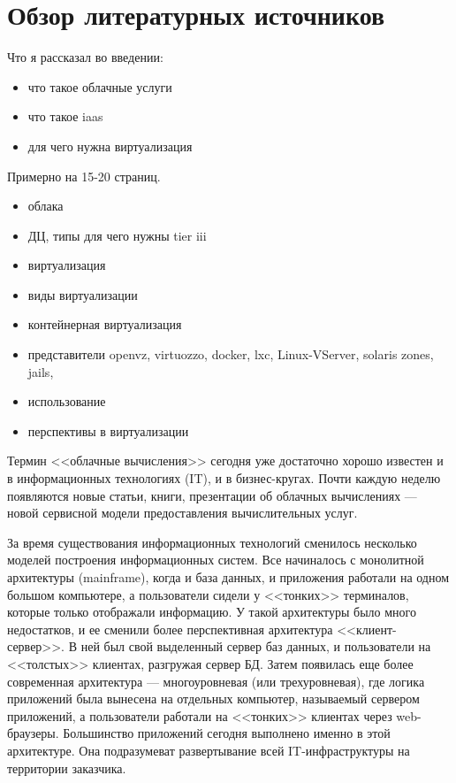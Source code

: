 \section{Обзор литературных источников}

Что я рассказал во введении:
\begin{itemize}
  \item что такое облачные услуги
  \item что такое iaas
  \item для чего нужна виртуализация
\end{itemize}


Примерно на 15-20 страниц.
\begin{itemize}
  \item облака
  \item ДЦ, типы для чего нужны tier iii
  \item виртуализация
  \item виды виртуализации
  \item контейнерная виртуализация
  \item представители openvz, virtuozzo, docker, lxc, Linux-VServer, solaris zones, jails, 
  \item использование
  \item перспективы в виртуализации
\end{itemize}

Термин <<облачные вычисления>> сегодня уже достаточно хорошо известен и в информационных технологиях (IT), и в бизнес-кругах.
Почти каждую неделю появляются новые статьи, книги, презентации об облачных вычислениях --- новой сервисной модели предоставления вычислительных услуг.

За время существования информационных технологий сменилось несколько моделей построения информационных систем.
Все начиналось с монолитной архитектуры (mainframe), когда и база данных, и приложения работали на одном большом компьютере, а пользователи сидели у <<тонких>> терминалов, которые только отображали информацию.
У такой архитектуры было много недостатков, и ее сменили более перспективная архитектура <<клиент-сервер>>.
В ней был свой выделенный сервер баз данных, и пользователи на <<толстых>> клиентах, разгружая сервер БД.
Затем появилась еще более современная архитектура --- многоуровневая (или трехуровневая), где логика приложений была вынесена на отдельных компьютер, называемый сервером приложений, а пользователи работали на <<тонких>> клиентах через web-браузеры.
Большинство приложений сегодня выполнено именно в этой архитектуре.
Она подразумеват развертывание всей IT-инфраструктуры на территории заказчика. \cite{oracle-db}

